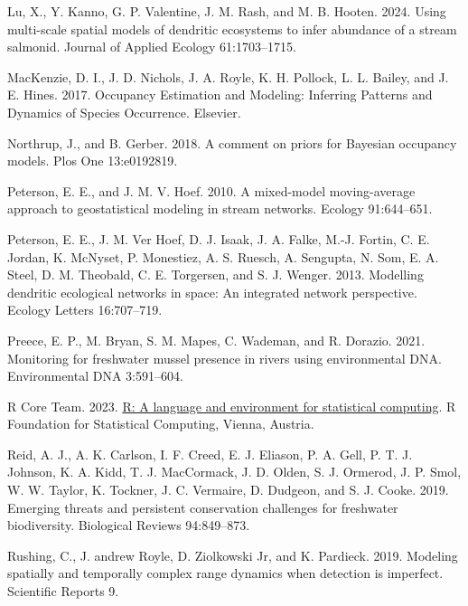 \documentclass[
  11pt,
  a4paper,
]{article}
\newlength{\cslhangindent}
\newenvironment{CSLReferences}[2] %
 {\begin{list}{}{%
  \setlength{\itemindent}{0pt}
  \setlength{\leftmargin}{0pt}
  \setlength{\parsep}{0pt}
  \ifodd #1
   \setlength{\leftmargin}{\cslhangindent}
   \setlength{\itemindent}{-1\cslhangindent}
  \fi
  \setlength{\itemsep}{#2\baselineskip}}}
 {\end{list}}
\begin{document}
\begin{CSLReferences}{1}{0}
Lu, X., Y. Kanno, G. P. Valentine, J. M. Rash, and M. B. Hooten. 2024. Using multi-scale spatial models of dendritic ecosystems to infer abundance of a stream salmonid. Journal of Applied Ecology 61:1703--1715.

MacKenzie, D. I., J. D. Nichols, J. A. Royle, K. H. Pollock, L. L. Bailey, and J. E. Hines. 2017. Occupancy {Estimation} and {Modeling}: {Inferring Patterns} and {Dynamics} of {Species Occurrence}. {Elsevier}.

Northrup, J., and B. Gerber. 2018. A comment on priors for {B}ayesian occupancy models. Plos One 13:e0192819.

Peterson, E. E., and J. M. V. Hoef. 2010. A mixed-model moving-average approach to geostatistical modeling in stream networks. Ecology 91:644--651.

Peterson, E. E., J. M. Ver Hoef, D. J. Isaak, J. A. Falke, M.-J. Fortin, C. E. Jordan, K. McNyset, P. Monestiez, A. S. Ruesch, A. Sengupta, N. Som, E. A. Steel, D. M. Theobald, C. E. Torgersen, and S. J. Wenger. 2013. Modelling dendritic ecological networks in space: An integrated network perspective. Ecology Letters 16:707--719.

Preece, E. P., M. Bryan, S. M. Mapes, C. Wademan, and R. Dorazio. 2021. Monitoring for freshwater mussel presence in rivers using environmental DNA. Environmental DNA 3:591--604.

R Core Team. 2023. \href{https://www.R-project.org/}{R: A language and environment for statistical computing}. R Foundation for Statistical Computing, Vienna, Austria.

Reid, A. J., A. K. Carlson, I. F. Creed, E. J. Eliason, P. A. Gell, P. T. J. Johnson, K. A. Kidd, T. J. MacCormack, J. D. Olden, S. J. Ormerod, J. P. Smol, W. W. Taylor, K. Tockner, J. C. Vermaire, D. Dudgeon, and S. J. Cooke. 2019. Emerging threats and persistent conservation challenges for freshwater biodiversity. Biological Reviews 94:849--873.

Rushing, C., J. andrew Royle, D. Ziolkowski Jr, and K. Pardieck. 2019. Modeling spatially and temporally complex range dynamics when detection is imperfect. Scientific Reports 9.


\end{CSLReferences}
\end{document}
